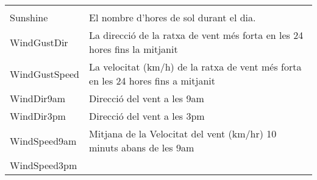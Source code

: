 \documentclass[
]{article}
\begin{document}
\begin{longtable}[]{@{}ll@{}}
\begin{minipage}[t]{0.75\columnwidth}
\end{minipage}\tabularnewline
\begin{minipage}[t]{0.19\columnwidth}\raggedright
Sunshine\strut
\end{minipage} & \begin{minipage}[t]{0.75\columnwidth}\raggedright
El nombre d'hores de sol durant el dia.\strut
\end{minipage}\tabularnewline
\begin{minipage}[t]{0.19\columnwidth}\raggedright
WindGustDir\strut
\end{minipage} & \begin{minipage}[t]{0.75\columnwidth}\raggedright
La direcció de la ratxa de vent més forta en les 24 hores fins la
mitjanit\strut
\end{minipage}\tabularnewline
\begin{minipage}[t]{0.19\columnwidth}\raggedright
WindGustSpeed\strut
\end{minipage} & \begin{minipage}[t]{0.75\columnwidth}\raggedright
La velocitat (km/h) de la ratxa de vent més forta en les 24 hores fins a
mitjanit\strut
\end{minipage}\tabularnewline
\begin{minipage}[t]{0.19\columnwidth}\raggedright
WindDir9am\strut
\end{minipage} & \begin{minipage}[t]{0.75\columnwidth}\raggedright
Direcció del vent a les 9am\strut
\end{minipage}\tabularnewline
\begin{minipage}[t]{0.19\columnwidth}\raggedright
WindDir3pm\strut
\end{minipage} & \begin{minipage}[t]{0.75\columnwidth}\raggedright
Direcció del vent a les 3pm\strut
\end{minipage}\tabularnewline
\begin{minipage}[t]{0.19\columnwidth}\raggedright
WindSpeed9am\strut
\end{minipage} & \begin{minipage}[t]{0.75\columnwidth}\raggedright
Mitjana de la Velocitat del vent (km/hr) 10 minuts abans de les
9am\strut
\end{minipage}\tabularnewline
\begin{minipage}[t]{0.19\columnwidth}\raggedright
WindSpeed3pm\strut
\end{minipage} & \begin{minipage}[t]{0.75\columnwidth}\raggedright

\end{minipage}
\end{longtable}
\end{document}
